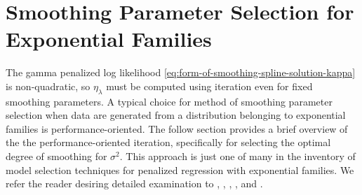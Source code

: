 \section{Smoothing Parameter Selection for Exponential Families}

%

The gamma penalized log likelihood \eqref{eq:form-of-smoothing-spline-solution-kappa} is non-quadratic, so $\eta_\lambda$ must be computed using iteration even for fixed smoothing parameters. A typical choice for method of smoothing parameter selection when data are generated from a distribution belonging to exponential families is performance-oriented. The follow section provides a brief overview of the the performance-oriented iteration, specifically for selecting the optimal degree of smoothing for $\sigma^2$. This approach is just one of many in the inventory of model selection techniques for penalized regression with exponential families. We refer the reader desiring detailed examination to \cite{zhang2006component}, \cite{xiang1996generalized}, \cite{wahba1995smoothing},  \cite{wood2004stable}, and \cite{wood2017generalized}. 

\bigskip


